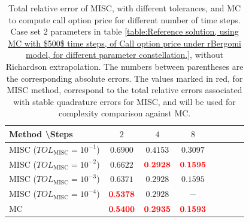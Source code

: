 \begin{table}[htbp]
	\centering
	\begin{tabular}{l*{6}{c}r}
		Method \textbackslash  Steps            & $2$ & $4$ & $8$   \\
		\hline
		MISC ($TOL_{\text{MISC}}=10^{-1}$)  & $\mathbf{
			0.6900}$& $\mathbf{    
			0.4153}$ & $\mathbf{     
			0.3097
		}$   \\
		MISC ($TOL_{\text{MISC}}=10^{-2}$)  & $\mathbf{ 
			0.6622}$ & $\mathbf{  {\color{red} 
				0.2928
			}
		}$ & $\mathbf{ {\color{red}    0.1595}}$   \\
		MISC ($TOL_{\text{MISC}}=10^{-3}$)        & $\mathbf{
			0.6371}$  &  $\mathbf{
			0.2928
		}$ &  $\mathbf{    0.1595}$ \\
		MISC ($TOL_{\text{MISC}}=10^{-4}$)        & $\mathbf{       {\color{red}0.5378}}$  & $\mathbf{
			0.2928
		}$  &  $-$ \\
		\hline
		MC    & $\mathbf{{\color{red}    0.5400}}$  & $\mathbf{{\color{red}0.2935}
		}$  &$\mathbf{{\color{red}
				0.1593}}$  \\	
		
		\hline
	\end{tabular}
	\caption{Total relative error of MISC, with different tolerances, and MC to compute call option price  for different number of time steps. Case  set $2$ parameters in table \ref{table:Reference solution, using MC with $500$ time steps, of Call option price under rBergomi model, for different parameter constellation.}, without Richardson extrapolation. The numbers between parentheses are the corresponding absolute errors. The values marked in red, for MISC method, correspond to the total relative errors associated with  stable quadrature errors for MISC, and will be used for complexity comparison against MC.}
	\label{Total error of MISC and MC to compute Call option price of the different tolerances for different number of time steps. Case $K=1$, $H=0.07$, without Richardson extrapolation. The numbers between parentheses are the corresponding absolute errors,linear}
\end{table}
\FloatBarrier

